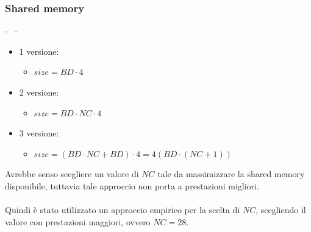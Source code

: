 \documentclass[compress]{beamer}
\begin{document}
\subsubsection*{Shared memory}
\begin{frame}{\secname \text{ }- \subsecname\ \text{ }- \subsubsecname}
    \begin{itemize}
        \item 1 versione:
        \begin{itemize}
            \item \(size = BD \cdot 4\)
        \end{itemize}
        \item 2 versione:
        \begin{itemize}
            \item \(size = BD \cdot NC \cdot 4\)
        \end{itemize}
        \item 3 versione:
        \begin{itemize}
            \item \(size = (BD \cdot NC + BD) \cdot 4 = 4 (BD \cdot (NC + 1))\)
        \end{itemize}
    \end{itemize}
    \vspace{0.5cm}
    Avrebbe senso scegliere un valore di \(NC\) tale da massimizzare la shared memory disponibile, tuttavia tale approccio non porta a prestazioni migliori. \\ \\
    Quindi è stato utilizzato un approccio empirico per la scelta di \(NC\), scegliendo il valore con prestazioni maggiori, ovvero \(NC = 28\).
\end{frame}
\end{document}

